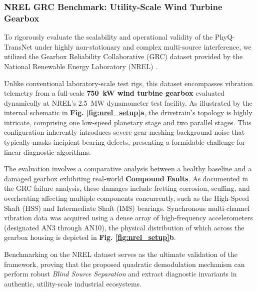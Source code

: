 \documentclass[5p,times,twocolumn]{elsarticle}
\begin{document}
\subsubsection{NREL GRC Benchmark: Utility-Scale Wind Turbine Gearbox}
To rigorously evaluate the scalability and operational validity of the PhyQ-TransNet under highly non-stationary and complex multi-source interference, we utilized the Gearbox Reliability Collaborative (GRC) dataset provided by the National Renewable Energy Laboratory (NREL) \cite{nrel_reference}. 

Unlike conventional laboratory-scale test rigs, this dataset encompasses vibration telemetry from a full-scale \textbf{\SI{750}{kW} wind turbine gearbox} evaluated dynamically at NREL's \SI{2.5}{MW} dynamometer test facility. As illustrated by the internal schematic in \textbf{Fig. \ref{fig:nrel_setup}a}, the drivetrain's topology is highly intricate, comprising one low-speed planetary stage and two parallel stages. This configuration inherently introduces severe gear-meshing background noise that typically masks incipient bearing defects, presenting a formidable challenge for linear diagnostic algorithms.

The evaluation involves a comparative analysis between a healthy baseline and a damaged gearbox exhibiting real-world \textbf{Compound Faults}. As documented in the GRC failure analysis, these damages include fretting corrosion, scuffing, and overheating affecting multiple components concurrently, such as the High-Speed Shaft (HSS) and Intermediate Shaft (IMS) bearings. Synchronous multi-channel vibration data was acquired using a dense array of high-frequency accelerometers (designated AN3 through AN10), the physical distribution of which across the gearbox housing is depicted in \textbf{Fig. \ref{fig:nrel_setup}b}. 

Benchmarking on the NREL dataset serves as the ultimate validation of the framework, proving that the proposed quadratic demodulation mechanism can perform robust \textit{Blind Source Separation} and extract diagnostic invariants in authentic, utility-scale industrial ecosystems.
\end{document}
